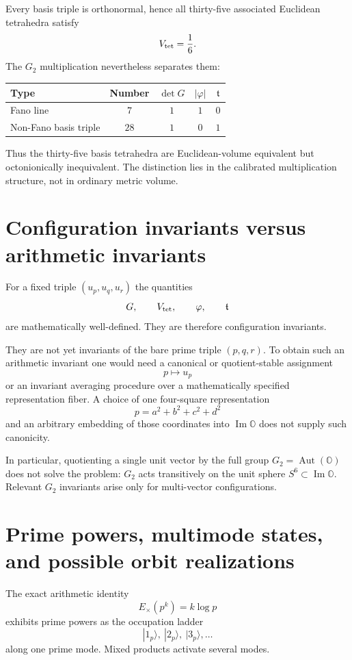 \documentclass[11pt,a4paper]{article}
\theoremstyle{definition}
\theoremstyle{remark}
\newcommand{\OO}{\mathbb O}
\newcommand{\Aut}{\operatorname{Aut}}
\begin{document}
Every basis triple is orthonormal, hence all thirty-five associated Euclidean tetrahedra satisfy
\[
V_{\rm tet}=\frac16.
\]
The $G_2$ multiplication nevertheless separates them:
\begin{center}
\begin{tabular}{@{}lcccc@{}}
\toprule
Type & Number & $\det G$ & $|\varphi|$ & $\mathfrak t$ \\
\midrule
Fano line & $7$ & $1$ & $1$ & $0$ \\
Non-Fano basis triple & $28$ & $1$ & $0$ & $1$ \\
\bottomrule
\end{tabular}
\end{center}
Thus the thirty-five basis tetrahedra are Euclidean-volume equivalent but octonionically inequivalent. The distinction lies in the calibrated multiplication structure, not in ordinary metric volume.

\section{Configuration invariants versus arithmetic invariants}
For a fixed triple $(u_p,u_q,u_r)$ the quantities
\[
G,\qquad V_{\rm tet},\qquad\varphi,\qquad\mathfrak t
\]
are mathematically well-defined. They are therefore configuration invariants.

They are not yet invariants of the bare prime triple $(p,q,r)$. To obtain such an arithmetic invariant one would need a canonical or quotient-stable assignment
\[
p\longmapsto u_p
\]
or an invariant averaging procedure over a mathematically specified representation fiber. A choice of one four-square representation
\[
p=a^2+b^2+c^2+d^2
\]
and an arbitrary embedding of those coordinates into $\operatorname{Im}\OO$ does not supply such canonicity.

In particular, quotienting a single unit vector by the full group $G_2=\Aut(\OO)$ does not solve the problem: $G_2$ acts transitively on the unit sphere $S^6\subset\operatorname{Im}\OO$. Relevant $G_2$ invariants arise only for multi-vector configurations.

\section{Prime powers, multimode states, and possible orbit realizations}
The exact arithmetic identity
\[
E_\times(p^k)=k\log p
\]
exhibits prime powers as the occupation ladder
\[
|1_p\rangle,\ |2_p\rangle,\ |3_p\rangle,\dots
\]
along one prime mode. Mixed products activate several modes.
\end{document}

